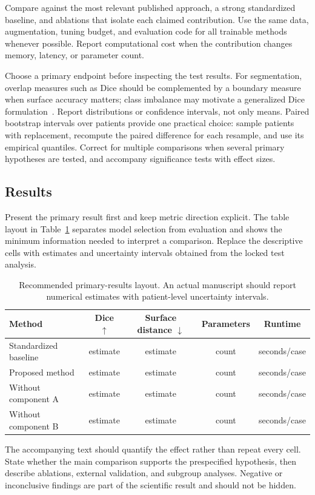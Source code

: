 Compare against the most relevant published approach, a strong standardized
baseline, and ablations that isolate each claimed contribution.  Use the same
data, augmentation, tuning budget, and evaluation code for all trainable
methods whenever possible.  Report computational cost when the contribution
changes memory, latency, or parameter count.

Choose a primary endpoint before inspecting the test results.  For
segmentation, overlap measures such as Dice should be complemented by a
boundary measure when surface accuracy matters; class imbalance may motivate a
generalized Dice formulation~\cite{sudre2017generalised}.  Report distributions
or confidence intervals, not only means.  Paired bootstrap intervals over
patients provide one practical choice: sample patients with replacement,
recompute the paired difference for each resample, and use its empirical
quantiles.  Correct for multiple comparisons when several primary hypotheses
are tested, and accompany significance tests with effect sizes.

\subsection{Results}

Present the primary result first and keep metric direction explicit.  The table
layout in Table~\ref{tab:results} separates model selection from evaluation and
shows the minimum information needed to interpret a comparison.  Replace the
descriptive cells with estimates and uncertainty intervals obtained from the
locked test analysis.

\begin{table}
  \caption{Recommended primary-results layout.  An actual manuscript should
  report numerical estimates with patient-level uncertainty intervals.}
  \label{tab:results}
  \centering
  \begin{tabular}{@{}lcccc@{}}
    \toprule
    Method & Dice $\uparrow$ & Surface distance $\downarrow$
           & Parameters & Runtime \\
    \midrule
    Standardized baseline & estimate & estimate & count & seconds/case \\
    Proposed method       & estimate & estimate & count & seconds/case \\
    Without component A   & estimate & estimate & count & seconds/case \\
    Without component B   & estimate & estimate & count & seconds/case \\
    \bottomrule
  \end{tabular}
\end{table}

The accompanying text should quantify the effect rather than repeat every
cell.  State whether the main comparison supports the prespecified hypothesis,
then describe ablations, external validation, and subgroup analyses.  Negative
or inconclusive findings are part of the scientific result and should not be
hidden.
